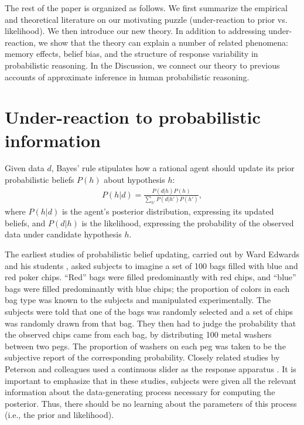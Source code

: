 The rest of the paper is organized as follows. We first summarize the empirical and theoretical literature on our motivating puzzle (under-reaction to prior vs. likelihood). We then introduce our new theory. In addition to addressing under-reaction, we show that the theory can explain a number of related phenomena: memory effects, belief bias, and the structure of response variability in probabilistic reasoning. In the Discussion, we connect our theory to previous accounts of approximate inference in human probabilistic reasoning.

\section{Under-reaction to probabilistic information}

Given data $d$, Bayes' rule stipulates how a rational agent should update its prior probabilistic beliefs $P(h)$ about hypothesis $h$:
\begin{align}
    P(h|d) = \frac{P(d|h)P(h)}{\sum_{h'} P(d|h') P(h')},
\end{align}
where $P(h|d)$ is the agent's posterior distribution, expressing its updated beliefs, and $P(d|h)$ is the likelihood, expressing the probability of the observed data under candidate hypothesis $h$.

The earliest studies of probabilistic belief updating, carried out by Ward Edwards and his students \citep{phillips1966conservatism,edwards1968conservatism}, asked subjects to imagine a set of 100 bags filled with blue and red poker chips. ``Red'' bags were filled predominantly with red chips, and ``blue'' bags were filled predominantly with blue chips; the proportion of colors in each bag type was known to the subjects and manipulated experimentally. The subjects were told that one of the bags was randomly selected and a set of chips was randomly drawn from that bag. They then had to judge the probability that the observed chips came from each bag, by distributing 100 metal washers between two pegs. The proportion of washers on each peg was taken to be the subjective report of the corresponding probability. Closely related studies by Peterson and colleagues used a continuous slider as the response apparatus \citep{peterson1965sample,peterson1965sensitivity,peterson1964uncertainty}. It is important to emphasize that in these studies, subjects were given all the relevant information about the data-generating process necessary for computing the posterior. Thus, there should be no learning about the parameters of this process (i.e., the prior and likelihood).

